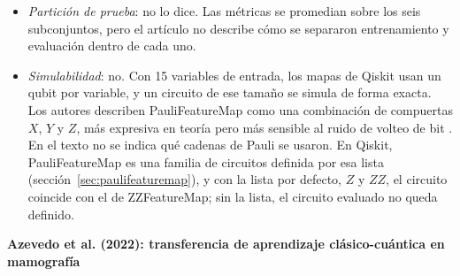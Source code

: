 \begin{itemize}
  Los valores por subconjunto de su tabla de resultados son 0.875, 0.937 y 1.000 \cite{ElHafidi2025}. Son múltiplos de 1/16, lo que es consistente con unas 16 muestras de evaluación por subconjunto: un solo error cambiaría la exactitud en 0.0625, más de seis veces la diferencia entre el mejor modelo cuántico y el mejor clásico. Esta lectura es una inferencia a partir de la tabla; el artículo no declara el tamaño de la partición de evaluación.
  \item \textit{Partición de prueba}: no lo dice. Las métricas se promedian sobre los seis subconjuntos, pero el artículo no describe cómo se separaron entrenamiento y evaluación dentro de cada uno.
  \item \textit{Simulabilidad}: no. Con 15 variables de entrada, los mapas de Qiskit usan un qubit por variable, y un circuito de ese tamaño se simula de forma exacta.
  Los autores describen PauliFeatureMap como una combinación de compuertas $X$, $Y$ y $Z$, más expresiva en teoría pero más sensible al ruido de volteo de bit \cite{ElHafidi2025}. En el texto no se indica qué cadenas de Pauli se usaron. En Qiskit, PauliFeatureMap es una familia de circuitos definida por esa lista (sección~\ref{sec:paulifeaturemap}), y con la lista por defecto, $Z$ y $ZZ$, el circuito coincide con el de ZZFeatureMap; sin la lista, el circuito evaluado no queda definido.
\end{itemize}

\textbf{Azevedo et al. (2022): transferencia de aprendizaje clásico-cuántica en mamografía}

